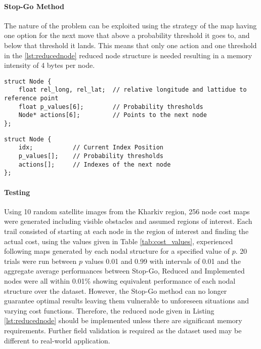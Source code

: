 \paragraph{Stop-Go Method}
The nature of the problem can be exploited using the strategy of the map having one option for the next move that above a probability threshold it goes to, and below that threshold it lands. This means that only one action and one threshold in the \ref{lst:reducednode} reduced node structure is needed resulting in a memory intensity of 4 bytes per node.
\begin{lstlisting}[caption={Implementated Node Structure},label={lst:node}]
struct Node {
    float rel_long, rel_lat;  // relative longitude and lattidue to reference point
    float p_values[6];        // Probability thresholds
    Node* actions[6];         // Points to the next node
};
\end{lstlisting}
\begin{lstlisting}[caption={Node Structure},label={lst:reducednode}]
struct Node {
    idx;           // Current Index Position
    p_values[];    // Probability thresholds
    actions[];     // Indexes of the next node
};
\end{lstlisting}

\paragraph{Testing}
Using 10 random satellite images from the Kharkiv region, 256 node cost maps were generated including visible obstacles and assumed regions of interest. Each trail consisted of starting at each node in the region of interest and finding the actual cost, using the values given in Table \ref{tab:cost_values}, experienced following maps generated by each nodal structure for a specified value of $p$. 20 trials were run between $p$ values 0.01 and 0.99 with intervals of 0.01 and the aggregate average performances between Stop-Go, Reduced and Implemented nodes were all within 0.01\% showing equivalent performance of each nodal structure over the dataset. However, the Stop-Go method can no longer guarantee optimal results leaving them vulnerable to unforeseen situations and varying cost functions. Therefore, the reduced node given in Listing \ref{lst:reducednode} should be implemented unless there are significant memory requirements. Further field validation is required as the dataset used may be different to real-world application.

